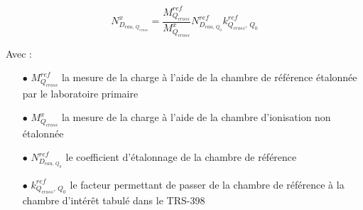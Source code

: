 \documentclass{article}
\begin{document}
\begin{equation}
  N_{D_{eau, \, Q_{cross}}}^x = \dfrac{M_{Q_{cross}}^{ref}}{M_{Q_{cross}}^x} N_{D_{eau,\, Q_0}}^{ref} k_{Q_{cross},\, Q_0}^{ref}
  \label{eq_cross_calib}
\end{equation}

Avec :

\begin{itemize}
  \item[$\bullet$] $M_{Q_{cross}}^{ref}$ la mesure de la charge à l'aide de la chambre de référence étalonnée par le laboratoire primaire
  \item[$\bullet$] $M_{Q_{cross}}^x$ la mesure de la charge à l'aide de la chambre d'ionisation non étalonnée
  \item[$\bullet$] $N_{D_{eau,\, Q_0}}^{ref}$ le coefficient d'étalonnage de la chambre de référence
  \item[$\bullet$] $k_{Q_{cross},\, Q_0}^{ref}$ le facteur permettant de passer de la chambre de référence à la chambre d'intérêt tabulé dans le TRS-398
\end{itemize}

\clearpage


\nocite{*}
\end{document}
